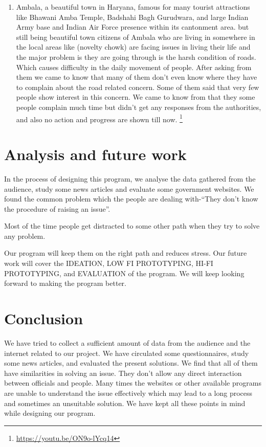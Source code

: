\documentclass[acmtog]{acmart}
\begin{document}
\begin{description}
\begin{enumerate}
        \footnote[3]{\url{https://economictimes.indiatimes.com/news/politics-and-nation/digital-india-government-websites-fail-to-clear-transparency-test/articleshow/53781991.cms?from=mdr
        }}
        \item Ambala, a beautiful town in Haryana, famous for many tourist attractions like Bhawani Amba Temple, Badshahi Bagh Gurudwara, and large Indian Army base and Indian Air Force presence within its cantonment area. but still being beautiful town citizens of Ambala who are living in somewhere in the local areas like (novelty chowk) are facing issues in living their life and the major problem is they are going through is the harsh condition of roads. Which causes difficulty in the daily movement of people. After asking from them we came to know that many of them don’t even know where they have to complain about the road related concern. Some of them said that very few people show interest in this concern. We came to know from that they some people complain much time but didn’t get any responses from the authorities, and also no action and progress are shown till now. 
        \footnote[4]{\url{https://youtu.be/ON9o-lYcq14}}
    \end{enumerate}

\end{description}


\section*{Analysis and future work}
In the process of designing this program, we analyse the data gathered from the audience, study some news articles and evaluate some government websites. We found the common problem which the people are dealing with-“They don’t know the procedure of raising an issue”.

\noindent Most of the time people get distracted to some other path when they try to solve any problem.

\noindent Our program will keep them on the right path and reduces stress. Our future work will cover the IDEATION, LOW FI PROTOTYPING, HI-FI PROTOTYPING, and EVALUATION of the program. We will keep looking forward to making the program better.

\section*{Conclusion}
We have tried to collect a sufficient amount of data from the audience and the internet related to our project. We have circulated some questionnaires, study some news articles, and evaluated the present solutions. We find that all of them have similarities in solving an issue. They don’t allow any direct interaction between officials and people. Many times the websites or other available programs are unable to understand the issue effectively which may lead to a long process and sometimes an unsuitable solution. We have kept all these points in mind while designing our program.
\end{document}

